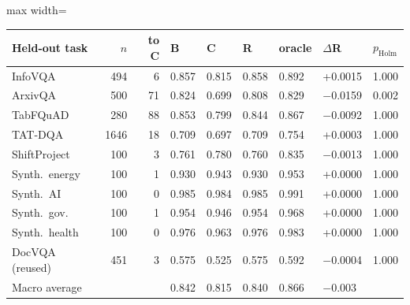 \begin{adjustbox}{max width=\linewidth}
\begin{tabular}{lrrllllll}
\toprule
Held-out task & $n$ & to C & B & C & R & oracle & $\Delta$R & $p_\mathrm{Holm}$ \\
\midrule
InfoVQA & 494 & 6 & 0.857 & 0.815 & 0.858 & 0.892 & +0.0015 & 1.000 \\
ArxivQA & 500 & 71 & 0.824 & 0.699 & 0.808 & 0.829 & $-$0.0159 & 0.002 \\
TabFQuAD & 280 & 88 & 0.853 & 0.799 & 0.844 & 0.867 & $-$0.0092 & 1.000 \\
TAT-DQA & 1646 & 18 & 0.709 & 0.697 & 0.709 & 0.754 & +0.0003 & 1.000 \\
ShiftProject & 100 & 3 & 0.761 & 0.780 & 0.760 & 0.835 & $-$0.0013 & 1.000 \\
Synth.\ energy & 100 & 1 & 0.930 & 0.943 & 0.930 & 0.953 & +0.0000 & 1.000 \\
Synth.\ AI & 100 & 0 & 0.985 & 0.984 & 0.985 & 0.991 & +0.0000 & 1.000 \\
Synth.\ gov. & 100 & 1 & 0.954 & 0.946 & 0.954 & 0.968 & +0.0000 & 1.000 \\
Synth.\ health & 100 & 0 & 0.976 & 0.963 & 0.976 & 0.983 & +0.0000 & 1.000 \\
DocVQA (reused) & 451 & 3 & 0.575 & 0.525 & 0.575 & 0.592 & $-$0.0004 & 1.000 \\
\midrule Macro average & & & 0.842 & 0.815 & 0.840 & 0.866 & $-$0.003 &  \\
\bottomrule
\end{tabular}
\end{adjustbox}
\par{}

